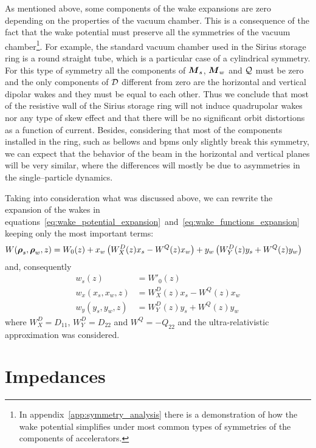     As mentioned above, some components of the wake expansions are zero depending on the properties of the vacuum chamber. This is a consequence of the fact that the wake potential must preserve all the symmetries of the vacuum chamber\footnote{In appendix~\ref{app:symmetry_analysis} there is a demonstration of how the wake potential simplifies under most common types of symmetries of the components of accelerators.}. For example, the standard vacuum chamber used in the Sirius storage ring is a round straight tube, which is a particular case of a cylindrical symmetry. For this type of symmetry all the components of $\boldsymbol{M}_s$, $\boldsymbol{M}_w$ and $\mathcal{Q}$ must be zero and the only components of $\mathcal{D}$ different from zero are the horizontal and vertical dipolar wakes and they must be equal to each other. Thus we conclude that most of the resistive wall of the Sirius storage ring will not induce quadrupolar wakes nor any type of skew effect and that there will be no significant orbit distortions as a function of current. Besides, considering that most of the components installed in the ring, such as bellows and \glspl{bpm} only slightly break this symmetry, we can expect that the behavior of the beam in the horizontal and vertical planes will be very similar, where the differences will mostly be due to asymmetries in the single--particle dynamics.

    Taking into consideration what was discussed above, we can rewrite the expansion of the wakes in equations~\eqref{eq:wake_potential_expansion}~and~\eqref{eq:wake_functions_expansion} keeping only the most important terms:
    \begin{align}\label{eq:important_wake_potential}
  	  	W(\boldsymbol{\rho}_s, \boldsymbol{\rho}_w, z) &=
	  		W_0(z) +
			x_w\left(W^D_X(z)x_s - W^Q(z)x_w\right) +
			y_w\left(W^D_Y(z)y_s + W^Q(z)y_w\right)
    \end{align}
    and, consequently
    \begin{align}\label{eq:important_wakes}\nonumber
  		w_s(z) &= W'_0(z) \\
		w_x(x_s, x_w, z) &= W^D_X(z)x_s - W^Q(z)x_w \\\nonumber
		w_y(y_s, y_w, z) &= W^D_Y(z)y_s + W^Q(z)y_w
    \end{align}
    where $W^D_X = D_{11}$, $W^D_Y = D_{22}$ and $W^Q = -Q_{22}$ and the ultra-relativistic approximation was considered.

\section{Impedances}\label{sec:impedances}

